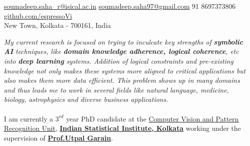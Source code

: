 \documentclass[10pt,a4paper]{article}
\begin{document}
\sloppy


\nobreakvspace{0.3em}

\noindent\href{mailto:soumadeep.saha\_r@isical.ac.in}{soumadeep.saha\_r@isical.ac.in}\sbull
\noindent\href{mailto:soumadeep.saha97@gmail.com}{soumadeep.saha97@gmail.com}\sbull
\textsmaller{+}91 8697373806\sbull
\href{https://github.com/espressoVi}{github.com/espressoVi}\\
New Town, Kolkata - 700161, India

\spacedhrule{0.9em}{-0.4em}


\vspace{-1.3em}  %
\begin{multicols}{2}  %
\noindent \emph{My current research is focused on trying to inculcate key strengths of \textbf{symbolic AI} techniques, like \textbf{domain knowledge adherence, logical coherence}, etc into \textbf{deep learning} systems.
	Addition of logical constraints and pre-existing knowledge not only makes these systems more aligned to critical applications but also makes them more data efficient.
	This problem shows up in many domains and thus leads me to work in several fields like natural language, medicine, biology, astrophysics and diverse business applications.}
\\
\\
	I am currently a $3^{rd}$ year PhD candidate at the \href{https://cvpru.isical.ac.in/}{Computer Vision and Pattern Recognition Unit}, \href{https://www.isical.ac.in/}{\textbf{Indian Statistical Institute, Kolkata}} working under the supervision of \textbf{\href{https://www.isical.ac.in/~utpal}{Prof.Utpal Garain}}.
\end{multicols}
\end{document}
